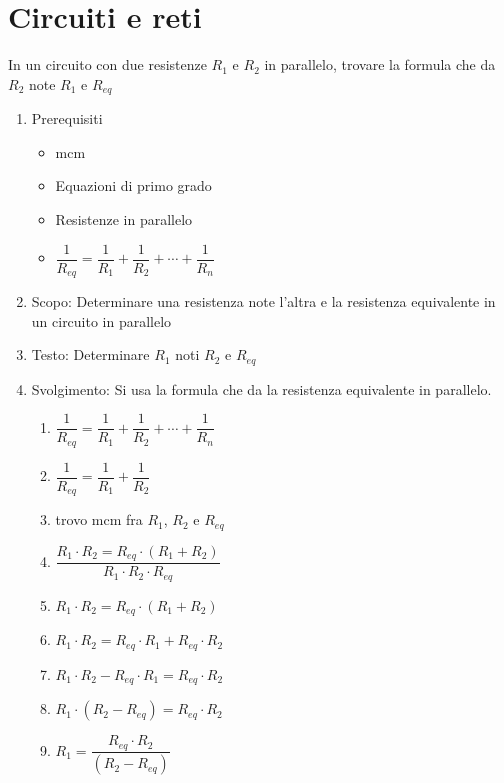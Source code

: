 
	\section{Circuiti e reti}
	\label{sec:CircuitieReti}
	\begin{table}[H]
		\caption{In un circuito con due resistenze $R_1$ e $R_2$ in parallelo, trovare la formula che da $R_2$ note $R_1$ e $R_{eq}$}
		\label{tab:Trovarediffangoli}
		\begin{enumerate}
			\item Prerequisiti 
			\begin{itemize}
				\item mcm
				\item Equazioni di primo grado
				\item Resistenze in parallelo
				\item $\dfrac{1}{R_{eq}}=\dfrac{1}{R_1}+\dfrac{1}{R_2}+\cdots+\dfrac{1}{R_n}$			
			\end{itemize}
			\item Scopo: Determinare una resistenza note l'altra e la resistenza equivalente in un circuito in parallelo
			\item Testo: Determinare $R_1$ noti $R_2$ e $R_{eq}$
			\item Svolgimento: Si usa la formula che da la resistenza equivalente in parallelo.
			\begin{enumerate}
				\item $\dfrac{1}{R_{eq}}=\dfrac{1}{R_1}+\dfrac{1}{R_2}+\cdots+\dfrac{1}{R_n}$
				\item $\dfrac{1}{R_{eq}}=\dfrac{1}{R_1}+\dfrac{1}{R_2}$
				\item trovo mcm fra $R_1$, $R_2$ e $R_{eq}$
				\item $\dfrac{R_1\cdot R_2=R_{eq}\cdot (R_1+R_2)}{R_1\cdot R_2\cdot R_{eq}}$
				\item $R_1\cdot R_2=R_{eq}\cdot (R_1+R_2)$
				\item $R_1\cdot R_2=R_{eq}\cdot R_1+R_{eq}\cdot R_2$
				\item $R_1\cdot R_2-R_{eq}\cdot R_1=R_{eq}\cdot R_2$
				\item $R_1\cdot (R_2-R_{eq})=R_{eq}\cdot R_2$
				\item $R_1=\dfrac{R_{eq}\cdot R_2}{(R_2-R_{eq})}$
			\end{enumerate}
		\end{enumerate}
	\end{table}
